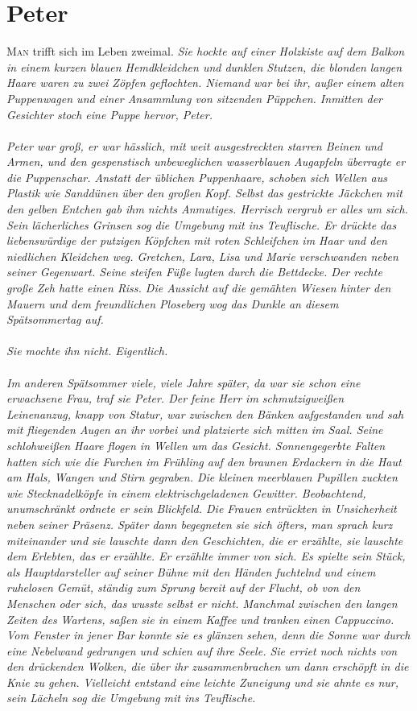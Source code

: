 \chapter{Peter}

\lettrine{M}{an} trifft sich im Leben zweimal.
\textit{Sie hockte auf einer Holzkiste auf dem Balkon in einem kurzen blauen Hemdkleidchen und dunklen Stutzen, die blonden langen Haare waren zu zwei Zöpfen geflochten. Niemand war bei ihr, außer einem alten Puppenwagen und einer Ansammlung von sitzenden Püppchen. Inmitten der Gesichter stoch eine Puppe hervor, Peter. \\\\
Peter war groß, er war hässlich, mit weit ausgestreckten starren Beinen und Armen, und den gespenstisch unbeweglichen wasserblauen Augapfeln überragte er die Puppenschar. Anstatt der üblichen Puppenhaare, schoben sich Wellen aus Plastik wie Sanddünen über den großen Kopf. Selbst das gestrickte Jäckchen mit den gelben Entchen gab ihm nichts Anmutiges. Herrisch vergrub er alles um sich. Sein lächerliches Grinsen sog die Umgebung mit ins Teuflische. Er drückte das liebenswürdige der putzigen Köpfchen mit roten Schleifchen im Haar und den niedlichen Kleidchen weg. Gretchen, Lara, Lisa und Marie verschwanden neben seiner Gegenwart. Seine steifen Füße lugten durch die Bettdecke. Der rechte große Zeh hatte einen Riss. Die Aussicht auf die gemähten Wiesen hinter den Mauern und dem freundlichen Ploseberg wog das Dunkle an diesem Spätsommertag auf. \\\\
Sie mochte ihn nicht. Eigentlich.\\\\
Im anderen Spätsommer viele, viele Jahre später, da war sie schon eine erwachsene Frau, traf sie Peter. Der feine Herr im schmutzigweißen Leinenanzug, knapp von Statur, war zwischen den Bänken aufgestanden und sah mit fliegenden Augen an ihr vorbei und platzierte sich mitten im Saal. Seine schlohweißen Haare flogen in Wellen um das Gesicht. Sonnengegerbte Falten hatten sich wie die Furchen im Frühling auf den braunen Erdackern in die Haut am Hals, Wangen und Stirn gegraben. Die kleinen meerblauen Pupillen zuckten wie Stecknadelköpfe in einem elektrischgeladenen Gewitter. Beobachtend, unumschränkt ordnete er sein Blickfeld. Die Frauen entrückten in Unsicherheit neben seiner Präsenz. Später dann begegneten sie sich öfters, man sprach kurz miteinander und sie lauschte dann den Geschichten, die er erzählte, sie lauschte dem Erlebten, das er erzählte. Er erzählte immer von sich. Es spielte sein Stück, als Hauptdarsteller auf seiner Bühne mit den Händen fuchtelnd und einem ruhelosen Gemüt, ständig zum Sprung bereit auf der Flucht, ob von den Menschen oder sich, das wusste selbst er nicht. Manchmal zwischen den langen Zeiten des Wartens, saßen sie in einem Kaffee und tranken einen Cappuccino. Vom Fenster in jener Bar konnte sie es glänzen sehen, denn die Sonne war durch eine Nebelwand gedrungen und schien auf ihre Seele. Sie erriet noch nichts von den drückenden Wolken, die über ihr zusammenbrachen um dann erschöpft in die Knie zu gehen. Vielleicht entstand eine leichte Zuneigung und sie ahnte es nur, sein Lächeln sog die Umgebung mit ins Teuflische. 
}
